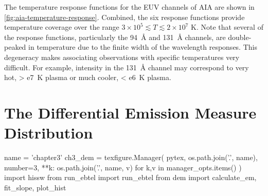 The temperature response functions for the EUV channels of AIA are shown in \autoref{fig:aia-temperature-response}. Combined, the six response functions provide temperature coverage over the range $3\times10^5\lesssim T\lesssim2\times10^7$ \si{\kelvin}. Note that several of the response functions, particularly the \SI{94}{\angstrom} and \SI{131}{\angstrom} channels, are double-peaked in temperature due to the finite width of the wavelength responses. This degeneracy makes associating observations with specific temperatures very difficult. For example, intensity in the \SI{131}{\angstrom} channel may correspond to very hot, \SI{> e7}{\kelvin} plasma or much cooler, \SI{< e6}{\kelvin} plasma.

\section{The Differential Emission Measure Distribution}\label{sec:dem}

\begin{pycode}
name = 'chapter3'
ch3_dem = texfigure.Manager(
    pytex,
    os.path.join('.', name),
    number=3,
    **{k: os.path.join('.', name, v) for k,v in manager_opts.items()}
)
import hissw
from run_ebtel import run_ebtel
from dem import calculate_em, fit_slope, plot_hist
\end{pycode}

